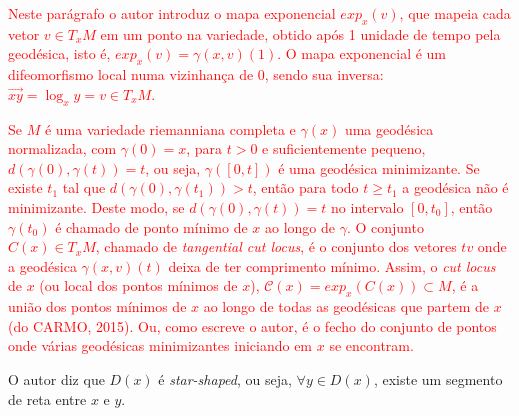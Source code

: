\documentclass[a4paper,titlepage]{article}
\newcommand{\juliana}[1]{\textcolor{red}{#1}}
\begin{document}
\vspace{1em}
\vspace{1em}

\juliana{Neste parágrafo o autor introduz o mapa exponencial $exp_x(v)$, que mapeia cada vetor $v \in T_xM$ em um ponto na variedade, obtido após 1 unidade de tempo pela geodésica, isto é, $exp_x(v)=\gamma(x,v)(1)$. O mapa exponencial é um difeomorfismo local numa vizinhança de 0, sendo sua inversa: $\overrightarrow{xy}=\log_x y = v \in T_xM$.}


\juliana{Se $M$ é uma variedade riemanniana completa e $\gamma (x)$ uma geodésica normalizada, com $\gamma (0)=x$, para $t>0$ e suficientemente pequeno, $d(\gamma (0), \gamma (t))=t$, ou seja, $\gamma ([0,t])$ é uma geodésica minimizante. Se existe $t_1$ tal que $d(\gamma (0), \gamma (t_1))>t$, então para todo $t\geq t_1$ a geodésica não é minimizante. Deste modo, se $d(\gamma (0), \gamma (t))=t$ no intervalo $[0,t_0]$, então $\gamma (t_0)$ é chamado de ponto mínimo de $x$ ao longo de $\gamma$.}
\juliana{O conjunto $C(x) \in T_xM$, chamado de \textit{tangential cut locus}, é o conjunto dos vetores $tv$ onde a geodésica $\gamma(x,v)(t)$ deixa de ter comprimento mínimo. Assim, o \textit{cut locus} de $x$ (ou local dos pontos mínimos de $x$), $\mathcal{C}(x)= exp_x(C(x)) \subset M$, é a união dos pontos mínimos de $x$ ao longo de todas as geodésicas que partem de $x$ (do CARMO, 2015). Ou, como escreve o autor, é o fecho do conjunto de pontos onde várias geodésicas minimizantes iniciando em $x$ se encontram.}

O autor diz que $D(x)$ é \emph{star-shaped}, ou seja, $\forall y \in D(x)$, existe um
segmento de reta entre $x$ e $y$.

\vspace{1em}
\vspace{1em}
\end{document}

